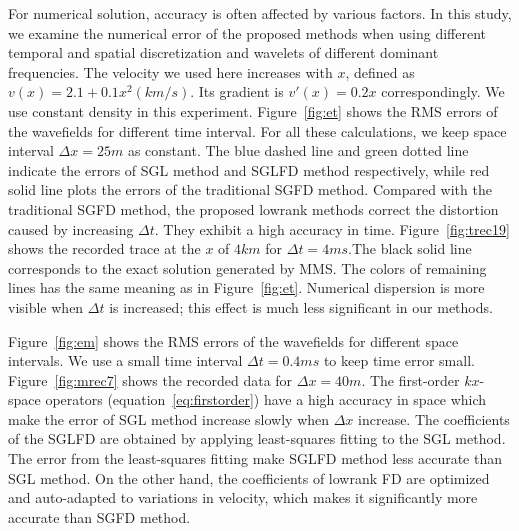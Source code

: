 For numerical solution, accuracy is often affected by various factors. In this study, we examine the numerical error of the proposed methods when using different temporal and spatial discretization and wavelets of different dominant frequencies. The velocity we used here increases with $x$, defined as $v(x)=2.1+0.1x^2(km/s)$. Its gradient is $v'(x)=0.2x$ correspondingly. We use constant density in this experiment. Figure~\ref{fig:et} shows the RMS errors of the wavefields for different time interval. For all these calculations, we keep space interval $\Delta x = 25m$ as constant. The blue dashed line and green dotted line indicate the errors of SGL method and SGLFD method respectively, while red solid line plots the errors of the traditional SGFD method. Compared with the traditional SGFD method, the proposed lowrank methods correct the distortion caused by increasing $\Delta t$. They exhibit a high accuracy in time. Figure~\ref{fig:trec19} shows the recorded trace at the $x$ of $4km$ for $\Delta t=4 ms$.The black solid line corresponds to the exact solution generated by MMS. The colors of remaining lines has the same meaning as in Figure~\ref{fig:et}. Numerical dispersion is more visible when $\Delta t$ is increased; this effect is much less significant in our methods.   


Figure~\ref{fig:em} shows the RMS errors of the wavefields for
different space intervals. We use a small time interval $\Delta t = 0.4ms$
to keep time error small. Figure~\ref{fig:mrec7} shows the recorded data for $\Delta x=40m$. The first-order $kx$-space operators
(equation~\ref{eq:firstorder}) have a high accuracy in space which
make the error of SGL method increase slowly when $\Delta x$
increase. The coefficients of the SGLFD are obtained by applying least-squares fitting to the SGL method. The error from the least-squares fitting make SGLFD method less accurate than SGL method. On the other hand, the
coefficients of lowrank FD are optimized and auto-adapted to variations in velocity, which makes it significantly more accurate than SGFD method.  


